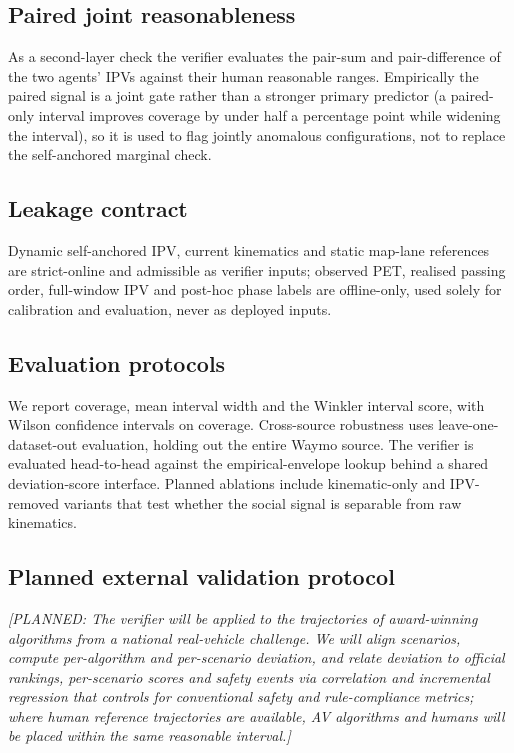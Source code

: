 \documentclass[12pt,a4paper]{article}
\newcommand{\planned}[1]{{\color{blue!60!black}\textit{[PLANNED: #1]}}}
\begin{document}
\subsection{Paired joint reasonableness}
As a second-layer check the verifier evaluates the pair-sum and pair-difference of the two
agents' IPVs against their human reasonable ranges. Empirically the paired signal is a joint
gate rather than a stronger primary predictor (a paired-only interval improves coverage by
under half a percentage point while widening the interval), so it is used to flag jointly
anomalous configurations, not to replace the self-anchored marginal check.

\subsection{Leakage contract}
Dynamic self-anchored IPV, current kinematics and static map-lane references are
strict-online and admissible as verifier inputs; observed PET, realised passing order,
full-window IPV and post-hoc phase labels are offline-only, used solely for calibration and
evaluation, never as deployed inputs.

\subsection{Evaluation protocols}
We report coverage, mean interval width and the Winkler interval score, with Wilson
confidence intervals on coverage. Cross-source robustness uses leave-one-dataset-out
evaluation, holding out the entire Waymo source. The verifier is evaluated head-to-head
against the empirical-envelope lookup behind a shared deviation-score interface. Planned
ablations include kinematic-only and IPV-removed variants that test whether the social signal
is separable from raw kinematics.

\subsection{Planned external validation protocol}
\planned{The verifier will be applied to the trajectories of award-winning algorithms from a
national real-vehicle challenge. We will align scenarios, compute per-algorithm and
per-scenario deviation, and relate deviation to official rankings, per-scenario scores and
safety events via correlation and incremental regression that controls for conventional
safety and rule-compliance metrics; where human reference trajectories are available, AV
algorithms and humans will be placed within the same reasonable interval.}
\end{document}
